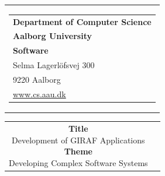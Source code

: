 


\thispagestyle{empty}

\begin{nopagebreak}
{
\samepage 
\begin{tabular}{r}
\parbox{\textwidth}
{
    \hfill \parbox{7.9cm}
    {
        \begin{tabular}{l}
            {\sf\small \textbf{Department of Computer Science}}\\
            {\sf\small \textbf{Aalborg University}}\\
            {\sf\small \textbf{Software}} \\
            {\sf\small Selma Lagerl\"{o}fsvej 300} \\
            {\sf\small 9220{  }Aalborg} \\
            {\sf\small \url{www.cs.aau.dk}}
        \end{tabular}
    }
}
\\
\end{tabular}

\begin{tabular}{cc}

    \parbox{6.5cm}
    {
        \textbf{Title} \\
        Development of GIRAF Applications \\

        \textbf{Theme} \\ 
        Developing Complex Software Systems \\

}
\end{tabular}}
\end{nopagebreak}
